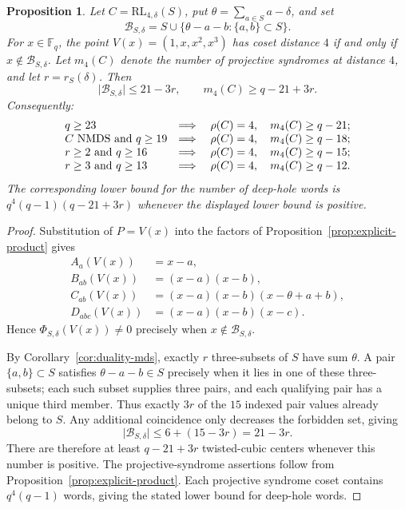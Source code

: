 ﻿\documentclass[11pt]{article}
\newcommand{\F}{\mathbb F}
\newcommand{\RL}{\mathrm{RL}}
\theoremstyle{plain}
\newtheorem{proposition}[theorem]{Proposition}
\theoremstyle{definition}
\begin{document}
\begin{proposition}
\label{prop:twisted-centers}
Let \(C=\RL_{4,\delta}(S)\), put
\(\theta=\sum_{a\in S}a-\delta\), and set
\[
 \mathcal{B}_{S,\delta}
 =S\cup\{\theta-a-b:\{a,b\}\subset S\}.
\]
For \(x\in\F_q\), the point \(V(x)=(1,x,x^2,x^3)\) has coset distance
\(4\) if and only if \(x\notin\mathcal{B}_{S,\delta}\).  Let \(m_4(C)\)
denote the number of projective syndromes at distance \(4\), and let
\(r=r_S(\delta)\).  Then
\[
  \lvert\mathcal{B}_{S,\delta}\rvert\le21-3r,\qquad
  m_4(C)\ge q-21+3r.
\]
Consequently:
\[
\begin{array}{ll}
q\ge23&\Longrightarrow\quad \rho(C)=4,\quad
 m_4(C)\ge q-21;\\
C\hbox{ NMDS and }q\ge19&\Longrightarrow\quad \rho(C)=4,\quad
 m_4(C)\ge q-18;\\
r\ge2\hbox{ and }q\ge16&\Longrightarrow\quad \rho(C)=4,\quad
 m_4(C)\ge q-15;\\
r\ge3\hbox{ and }q\ge13&\Longrightarrow\quad \rho(C)=4,\quad
 m_4(C)\ge q-12.
\end{array}
\]
The corresponding lower bound for the number of deep-hole words is
\(q^4(q-1)(q-21+3r)\) whenever the displayed lower bound is positive.
\end{proposition}

\begin{proof}
Substitution of \(P=V(x)\) into the factors of
Proposition~\ref{prop:explicit-product} gives
\[
\begin{aligned}
A_a(V(x))&=x-a,\\
B_{ab}(V(x))&=(x-a)(x-b),\\
C_{ab}(V(x))&=(x-a)(x-b)(x-\theta+a+b),\\
D_{abc}(V(x))&=(x-a)(x-b)(x-c).
\end{aligned}
\]
Hence \(\Phi_{S,\delta}(V(x))\ne0\) precisely when
\(x\notin\mathcal{B}_{S,\delta}\).

By Corollary~\ref{cor:duality-mds}, exactly \(r\) three-subsets of \(S\)
have sum \(\theta\).  A pair \(\{a,b\}\subset S\) satisfies
\(\theta-a-b\in S\) precisely when it lies in one of these three-subsets;
each such subset supplies three pairs, and each qualifying pair has a
unique third member.  Thus exactly \(3r\) of the \(15\) indexed pair values
already belong to \(S\).  Any additional coincidence only decreases the
forbidden set, giving
\[
 \lvert\mathcal{B}_{S,\delta}\rvert\le 6+(15-3r)=21-3r.
\]
There are therefore at least \(q-21+3r\) twisted-cubic centers whenever
this number is positive.  The projective-syndrome assertions follow from
Proposition~\ref{prop:explicit-product}.  Each projective syndrome coset
contains \(q^4(q-1)\) words, giving the stated lower bound for deep-hole
words.
\end{proof}
\end{document}
